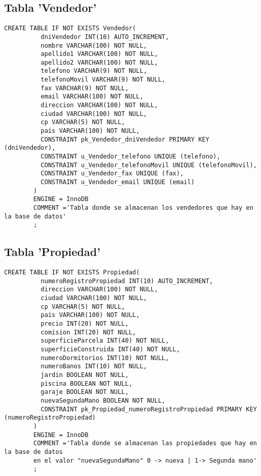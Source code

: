 \documentclass{article}
\begin{document}
    \subsection{Tabla 'Vendedor'}
      \begin{lstlisting}[style=C]
        CREATE TABLE IF NOT EXISTS Vendedor(
          dniVendedor INT(10) AUTO_INCREMENT,
          nombre VARCHAR(100) NOT NULL,
          apellido1 VARCHAR(100) NOT NULL,
          apellido2 VARCHAR(100) NOT NULL,
          telefono VARCHAR(9) NOT NULL,
          telefonoMovil VARCHAR(9) NOT NULL,
          fax VARCHAR(9) NOT NULL,
          email VARCHAR(100) NOT NULL,
          direccion VARCHAR(100) NOT NULL,
          ciudad VARCHAR(100) NOT NULL,
          cp VARCHAR(5) NOT NULL,
          pais VARCHAR(100) NOT NULL,
          CONSTRAINT pk_Vendedor_dniVendedor PRIMARY KEY (dniVendedor),
          CONSTRAINT u_Vendedor_telefono UNIQUE (telefono),
          CONSTRAINT u_Vendedor_telefonoMovil UNIQUE (telefonoMovil),
          CONSTRAINT u_Vendedor_fax UNIQUE (fax),
          CONSTRAINT u_Vendedor_email UNIQUE (email)
        )
        ENGINE = InnoDB
        COMMENT ='Tabla donde se almacenan los vendedores que hay en la base de datos'
        ;
      \end{lstlisting}

    \subsection{Tabla 'Propiedad'}
      \begin{lstlisting}[style=C]
        CREATE TABLE IF NOT EXISTS Propiedad(
          numeroRegistroPropiedad INT(10) AUTO_INCREMENT,
          direccion VARCHAR(100) NOT NULL,
          ciudad VARCHAR(100) NOT NULL,
          cp VARCHAR(5) NOT NULL,
          pais VARCHAR(100) NOT NULL,
          precio INT(20) NOT NULL,
          comision INT(20) NOT NULL,
          superficieParcela INT(40) NOT NULL,
          superficieConstruida INT(40) NOT NULL,
          numeroDormitorios INT(10) NOT NULL,
          numeroBanos INT(10) NOT NULL,
          jardin BOOLEAN NOT NULL,
          piscina BOOLEAN NOT NULL,
          garaje BOOLEAN NOT NULL,
          nuevaSegundaMano BOOLEAN NOT NULL,
          CONSTRAINT pk_Propiedad_numeroRegistroPropiedad PRIMARY KEY (numeroRegistroPropiedad)
        )
        ENGINE = InnoDB
        COMMENT ='Tabla donde se almacenan las propiedades que hay en la base de datos
        en el valor "nuevaSegundaMano" 0 -> nueva | 1-> Segunda mano'
        ;
      \end{lstlisting}
\end{document}

